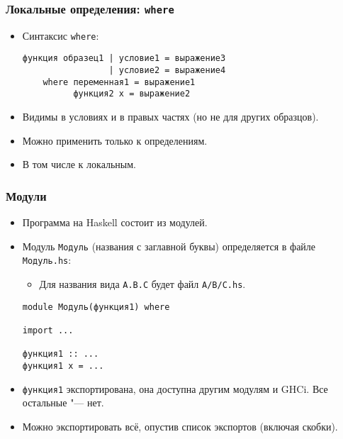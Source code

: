 \documentclass[10pt]{beamer}
\begin{document}
\begin{frame}[fragile]
  \frametitle{Локальные определения: \lstinline[basicstyle=\ttfamily]|where|}
  \begin{itemize}
    \item Синтаксис \lstinline|where|:
          \begin{lstlisting}
функция образец1 | условие1 = выражение3
                 | условие2 = выражение4
    where переменная1 = выражение1
          функция2 x = выражение2
\end{lstlisting}
    \item Видимы в условиях и в правых частях (но не для других образцов).
    \item Можно применить только к определениям.
    \item В том числе к локальным.
  \end{itemize}
\end{frame}

\begin{frame}[fragile]
  \frametitle{Модули}
  \begin{itemize}
    \item Программа на Haskell состоит из модулей.
    \item Модуль \lstinline|Модуль| (названия с заглавной буквы) определяется в файле \lstinline|Модуль.hs|:
          \begin{itemize}
            \item Для названия вида \lstinline|A.B.C| будет файл \lstinline|A/B/C.hs|.
          \end{itemize}
          \begin{lstlisting}
module Модуль(функция1) where

import ...

функция1 :: ...
функция1 x = ...
\end{lstlisting}
    \item \lstinline|функция1| экспортирована, она доступна другим модулям и GHCi. Все остальные "--- нет.
    \item Можно экспортировать всё, опустив список экспортов (включая скобки).
  \end{itemize}
\end{frame}
\end{document}
